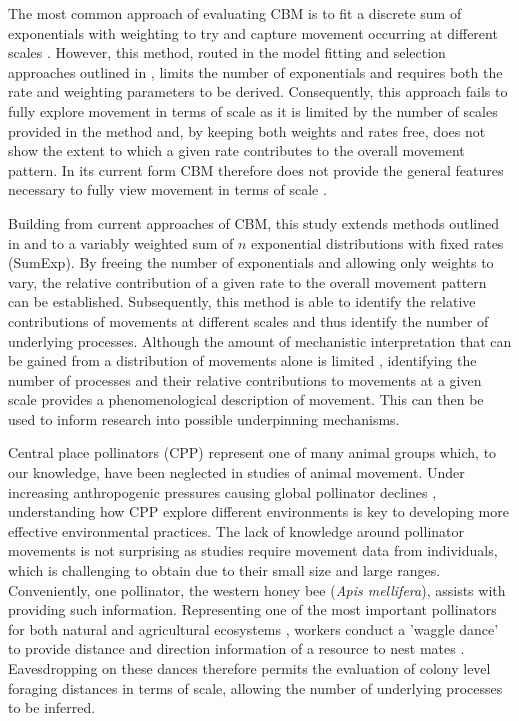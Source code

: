 \documentclass[11pt,usenames,dvipsnames,a4paper]{article}
\begin{document}
\begin{linenumbers}
The most common approach of evaluating CBM is to fit a discrete sum of exponentials with weighting to try and capture movement occurring at different scales \citep{DeJager2013, Jansen2012, Kolzsch2015, Wosniack2017}. However, this method, routed in the model fitting and selection approaches outlined in \cite{Murphy2007}, limits the number of exponentials and requires both the rate and weighting parameters to be derived. Consequently, this approach fails to fully explore movement in terms of scale as it is limited by the number of scales provided in the method \citep{Jansen2012} and, by keeping both weights and rates free, does not show the extent to which a given rate contributes to the overall movement pattern. In its current form CBM therefore does not provide the general features necessary to fully view movement in terms of scale \citep{Nathan2008, Patterson2017}. 

Building from current approaches of CBM, this study extends methods outlined in \cite{Petrovskii2011} and \cite{Jansen2012} to a variably weighted sum of $n$ exponential distributions with fixed rates (SumExp). By freeing the number of exponentials and allowing only weights to vary, the relative contribution of a given rate to the overall movement pattern can be established. Subsequently, this method is able to identify the relative contributions of movements at different scales and thus identify the number of underlying processes. Although the amount of mechanistic interpretation that can be gained from a distribution of movements alone is limited \citep{Bearup2016}, identifying the number of processes and their relative contributions to movements at a given scale provides a phenomenological description of movement. This can then be used to inform research into possible underpinning mechanisms. 

Central place pollinators (CPP) represent one of many animal groups which, to our knowledge, have been neglected in studies of animal movement. Under increasing anthropogenic pressures causing global pollinator declines \citep{Powney2019}, understanding how CPP explore different environments is key to developing more effective environmental practices. The lack of knowledge around pollinator movements is not surprising as studies require movement data from individuals, which is challenging to obtain due to their small size and large ranges. Conveniently, one pollinator, the western honey bee (\textit{Apis mellifera}), assists with providing such information. Representing one of the most important pollinators for both natural and agricultural ecosystems \citep{Albrecht2018}, workers conduct a 'waggle dance' to provide distance and direction information of a resource to nest mates \citep{Seeley1995}. Eavesdropping on these dances therefore permits the evaluation of colony level foraging distances in terms of scale, allowing the number of underlying processes to be inferred.


\end{linenumbers}
\end{document}
